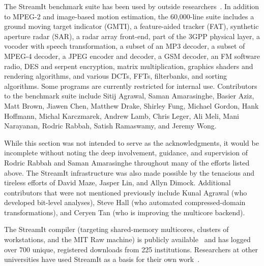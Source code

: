 The StreamIt benchmark suite has been used by outside
researchers~\cite{kudlur_orchestratingexecution_2008}.
In addition to MPEG-2 and image-based motion estimation, the
60,000-line suite includes a ground moving target indicator (GMTI), a
feature-aided tracker (FAT), synthetic aperture radar (SAR), a radar
array front-end, part of the 3GPP physical layer, a vocoder with
speech transformation, a subset of an MP3 decoder, a subset of MPEG-4
decoder, a JPEG encoder and decoder, a GSM decoder, an FM software
radio, DES and serpent encryption, matrix multiplication, graphics
shaders and rendering algorithms, and various DCTs, FFTs, filterbanks,
and sorting algorithms.  Some programs are currently restricted for
internal use.
Contributors to the benchmark suite include Sitij Agrawal, Saman
Amarasinghe, Basier Aziz, Matt Brown, Jiawen Chen, Matthew Drake,
Shirley Fung, Michael Gordon, Hank Hoffmann, Michal Karczmarek, Andrew
Lamb, Chris Leger, Ali Meli, Mani Narayanan, Rodric Rabbah, Satish
Ramaswamy, and Jeremy Wong.


While this section was not intended to serve as the acknowledgments,
it would be incomplete without noting the deep involvement, guidance,
and supervision of Rodric Rabbah and Saman Amarasinghe throughout many
of the efforts listed above.  The StreamIt infrastructure was also
made possible by the tenacious and tireless efforts of David Maze,
Jasper Lin, and Allyn Dimock.  Additional contributors that were not
mentioned previously include Kunal Agrawal (who developed bit-level
analyses), Steve Hall (who automated compressed-domain
transformations), and Ceryen Tan (who is improving the multicore
backend).

The StreamIt compiler (targeting shared-memory multicores, clusters of
workstations, and the MIT Raw machine) is publicly
available~\cite{streamitweb} and has logged over 700 unique,
registered downloads from 225 institutions.  Researchers at other
universities have used StreamIt as a basis for their own
work~\cite{mani-permutations,bit-streaming,ola-techrep,duca-thesis,won-thesis}.

